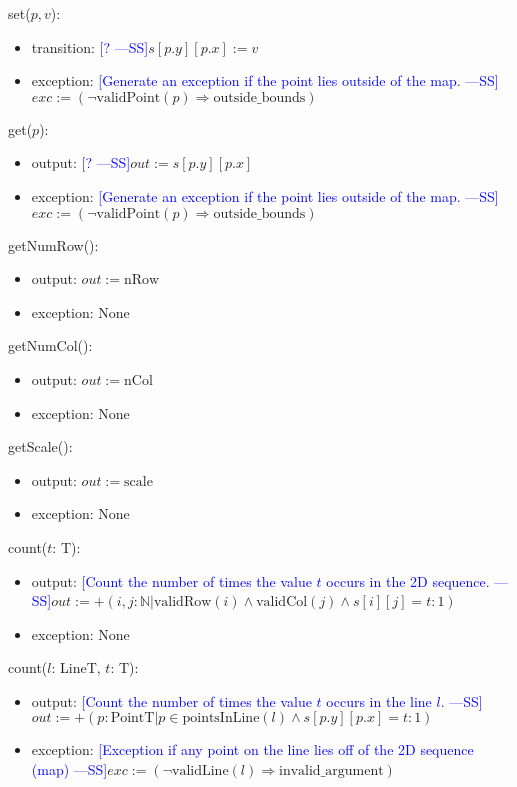 \documentclass[12pt]{article}
\newcommand{\authornote}[3]{\textcolor{#1}{[#3 ---#2]}}
\newcommand{\authornote}[3]{}
\newcommand{\wss}[1]{\authornote{blue}{SS}{#1}}
\begin{document}
\noindent set($p, v$):
\begin{itemize}
\item transition: \wss{?}$s[p.y][p.x] := v$
\item exception: \wss{Generate an exception if the point lies outside of the
    map.}$exc := (\neg \mbox{validPoint}(p) \Rightarrow \mbox{outside\_bounds})$
\end{itemize}

\noindent get($p$):
\begin{itemize}
\item output: \wss{?}$out := s[p.y][p.x]$
\item exception: \wss{Generate an exception if the point lies outside of the
    map.}$exc := (\neg \mbox{validPoint}(p) \Rightarrow \mbox{outside\_bounds})$
\end{itemize}

\noindent getNumRow():
\begin{itemize}
\item output: $out := \mbox{nRow}$
\item exception: None
\end{itemize}

\noindent getNumCol():
\begin{itemize}
\item output: $out := \mbox{nCol}$
\item exception: None
\end{itemize}

\noindent getScale():
\begin{itemize}
\item output: $out := \mbox{scale}$
\item exception: None
\end{itemize}

\noindent count($t$: T):
\begin{itemize}
\item output: \wss{Count the number of times the value $t$ occurs in the 2D
    sequence.}$out := +(i, j: \mathbb{N}| \mbox{validRow}(i) \land
  \mbox{validCol}(j) \wedge s[i][j] = t : 1)$
\item exception: None
\end{itemize}

\noindent count($l$: LineT, $t$: T):
\begin{itemize}
\item output: \wss{Count the number of times the value $t$ occurs in the line
    $l$.}$out := +(p: \mbox{PointT} | p \in \mbox{pointsInLine}(l) \wedge
  s[p.y][p.x] = t : 1)$
\item exception: \wss{Exception if any point on the line lies off of the 2D
    sequence (map)}$exc := (\neg\mbox{validLine}(l) \Rightarrow \mbox{invalid\_argument})$
\end{itemize}
\end{document}
